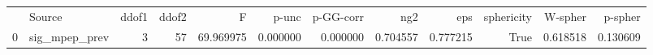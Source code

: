 \begin{tabular}{llrrrrrrrrrr}
 & Source & ddof1 & ddof2 & F & p-unc & p-GG-corr & ng2 & eps & sphericity & W-spher & p-spher \\
0 & sig_mpep_prev & 3 & 57 & 69.969975 & 0.000000 & 0.000000 & 0.704557 & 0.777215 & True & 0.618518 & 0.130609 \\
\end{tabular}
